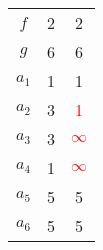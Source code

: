 \begin{center}
\begin{minipage}[t]{.4\linewidth}
\begin{longtable}[c]{| c | c | c|}
     $f$ & 2 & 2\\
     $g$ & 6 & 6\\
     $a_1$ & 1 & 1\\
     $a_2$ & 3 & \textcolor{red}{1}\\
     $a_3$ & 3 & \textcolor{red}{$\infty$}\\
     $a_4$ & 1 & \textcolor{red}{$\infty$}\\
     $a_5$ & 5 & 5\\
     $a_6$ & 5 & 5\\
     \hline
\end{longtable}
\end{minipage}
\end{center}